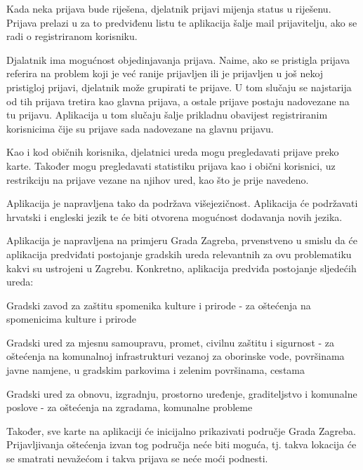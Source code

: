 		Kada neka prijava bude riješena, djelatnik prijavi mijenja status u riješenu. Prijava prelazi u za to predviđenu listu te aplikacija šalje mail  prijavitelju, ako se radi o registriranom korisniku.
		
		Djalatnik ima mogućnost objedinjavanja prijava. Naime, ako se pristigla prijava referira na problem koji je već ranije prijavljen ili je prijavljen u još nekoj pristigloj prijavi, djelatnik može grupirati te prijave. U tom slučaju se najstarija od tih prijava tretira kao glavna prijava, a ostale prijave postaju nadovezane na tu prijavu. Aplikacija u tom slučaju šalje prikladnu obavijest registriranim korisnicima čije su prijave sada nadovezane na glavnu prijavu.
		
		Kao i kod običnih korisnika, djelatnici ureda mogu pregledavati prijave preko karte. Također mogu pregledavati statistiku prijava kao i obični korisnici, uz restrikciju na prijave vezane na njihov ured, kao što je prije navedeno.
		
		Aplikacija je napravljena tako da podržava višejezičnost. Aplikacija će podržavati hrvatski i engleski jezik te će biti otvorena mogućnost dodavanja novih jezika.
		
		Aplikacija je napravljena na primjeru Grada Zagreba, prvenstveno u smislu da će aplikacija predviđati postojanje gradskih ureda relevantnih za ovu problematiku kakvi su ustrojeni u Zagrebu. Konkretno, aplikacija predviđa postojanje sljedećih ureda:
		\begin{packed_item}
			\item Gradski zavod za zaštitu spomenika kulture i prirode - za oštećenja na spomenicima kulture i prirode
			\item Gradski ured za mjesnu samoupravu, promet, civilnu zaštitu i sigurnost - za oštećenja na komunalnoj infrastrukturi vezanoj za oborinske vode, površinama javne namjene, u gradskim parkovima i zelenim površinama, cestama
			\item Gradski ured za obnovu, izgradnju, prostorno uređenje, graditeljstvo i komunalne poslove - za oštećenja na zgradama, komunalne probleme
		\end{packed_item}
		Također, sve karte na aplikaciji će inicijalno prikazivati područje Grada Zagreba. Prijavljivanja oštećenja izvan tog područja neće biti moguća, tj. takva lokacija će se smatrati nevažećom i takva prijava se neće moći podnesti.
		
